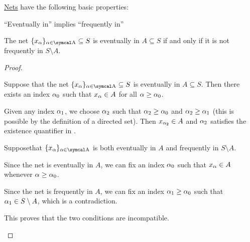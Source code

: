\begin{proposition}\label{thm:topological_net_properties}
  \hyperref[def:topological_net]{Nets} have the following basic properties:

  \begin{propenum}
     \enquote{Eventually in} implies \enquote{frequently in}

     The net \( \{ x_\al \}_{\al \in \CA} \subseteq S \) is eventually in \( A \subseteq S \) if and only if it is not frequently in \( S \setminus A \).
  \end{propenum}
\end{proposition}
\begin{proof}\mbox{}
  \begin{description}
     Suppose that the net \( \{ x_\al \}_{\al \in \CA} \subseteq S \) is eventually in \( A \subseteq S \). Then there exists an index \( \alpha_0 \) such that \( x_\alpha \in A \) for all \( \alpha \geq \alpha_0 \).

    Given any index \( \alpha_1 \), we choose \( \alpha_2 \) such that \( \alpha_2 \geq \alpha_0 \) and \( \alpha_2 \geq \alpha_1 \) (this is possible by the definition of a directed set). Then \( x_{\alpha_2} \in A \) and \( \alpha_2 \) satisfies the existence quantifier in .

     Suppose\LEM that \( \{ x_\al \}_{\al \in \CA} \) is both eventually in \( A \) and frequently in \( S \setminus A \).

    Since the net is eventually in \( A \), we can fix an index \( \alpha_0 \) such that \( x_\alpha \in A \) whenever \( \alpha \geq \alpha_0 \).

    Since the net is frequently in \( A \), we can fix an index \( \alpha_1 \geq \alpha_0 \) such that \( \alpha_1 \in S \setminus A \), which is a contradiction.

    This proves that the two conditions are incompatible.
  \end{description}
\end{proof}

